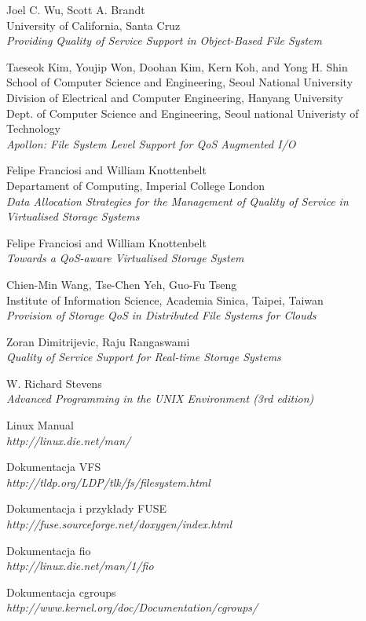 \documentclass[man,bazy,a4paper,11pt,sfheadings,noindentfirst]{mgrwms}
\begin{document}






\begin{thebibliography}{9}
Joel C. Wu, Scott A. Brandt\\
University of California, Santa Cruz\\
\emph{Providing Quality of Service Support in Object-Based File System}

Taeseok Kim, Youjip Won, Doohan Kim, Kern Koh, and Yong H. Shin\\
School of Computer Science and Engineering, Seoul National University\\
Division of Electrical and Computer Engineering, Hanyang University\\
Dept. of Computer Science and Engineering, Seoul national Univeristy of Technology\\
\emph{Apollon: File System Level Support for QoS Augmented I/O}

Felipe Franciosi and William Knottenbelt\\
Departament of Computing, Imperial College London\\
\emph{Data Allocation Strategies for the Management of Quality of Service in Virtualised Storage Systems}

Felipe Franciosi and William Knottenbelt\\
\emph{Towards a QoS-aware Virtualised Storage System}

Chien-Min Wang, Tse-Chen Yeh, Guo-Fu Tseng\\
Institute of Information Science, Academia Sinica, Taipei, Taiwan\\
\emph{Provision of Storage QoS in Distributed File Systems for Clouds}

Zoran Dimitrijevic, Raju Rangaswami\\
\emph{Quality of Service Support for Real-time Storage Systems}

W. Richard Stevens\\
\emph{Advanced Programming in the UNIX Environment (3rd edition)}

Linux Manual\\
\emph{http://linux.die.net/man/}

Dokumentacja VFS\\
\emph{http://tldp.org/LDP/tlk/fs/filesystem.html}

Dokumentacja i przykłady FUSE\\
\emph{http://fuse.sourceforge.net/doxygen/index.html}

Dokumentacja fio\\
\emph{http://linux.die.net/man/1/fio}

Dokumentacja cgroups\\
\emph{http://www.kernel.org/doc/Documentation/cgroups/}
\end{thebibliography}
\nocite{*}
\end{document}
